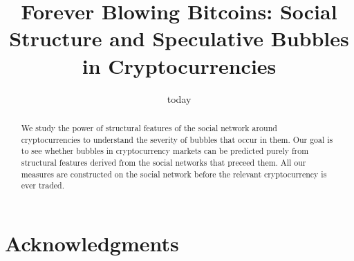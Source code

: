 \documentclass{acm_proc_article_sp}%
\title{Forever Blowing Bitcoins: Social Structure and Speculative Bubbles in Cryptocurrencies}
\date{today}
\begin{document}
\maketitle

\begin{abstract}

We study the power of structural features of the social network around cryptocurrencies to understand the severity of bubbles that occur in them. Our goal is to see whether bubbles in cryptocurrency markets can be predicted purely from structural features derived from the social networks that preceed them. All our measures are constructed on the social network before the relevant cryptocurrency is ever traded. 

\end{abstract}













%






\section{Acknowledgments}

%

%
%
\appendix

\newpage

\newpage


\end{document}
